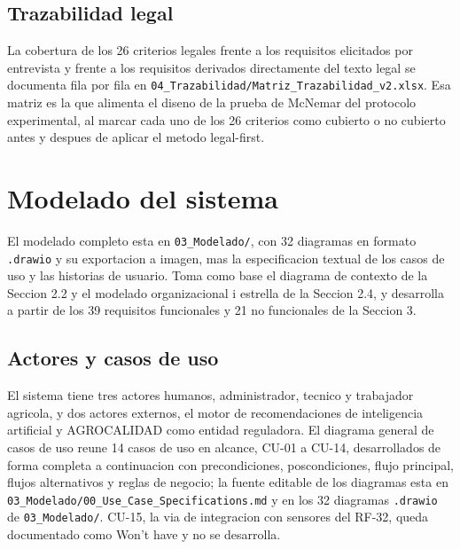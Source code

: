 \documentclass[11pt,a4paper]{article}
\newcommand{\ruta}[1]{\texttt{#1}}
\begin{document}

\subsection{Trazabilidad legal}

La cobertura de los 26 criterios legales frente a los requisitos elicitados por entrevista y frente a los requisitos derivados directamente del texto legal se documenta fila por fila en \ruta{04\_Trazabilidad/Matriz\_Trazabilidad\_v2.xlsx}. Esa matriz es la que alimenta el diseno de la prueba de McNemar del protocolo experimental, al marcar cada uno de los 26 criterios como cubierto o no cubierto antes y despues de aplicar el metodo legal-first.

\section{Modelado del sistema}

El modelado completo esta en \ruta{03\_Modelado/}, con 32 diagramas en formato \texttt{.drawio} y su exportacion a imagen, mas la especificacion textual de los casos de uso y las historias de usuario. Toma como base el diagrama de contexto de la Seccion 2.2 y el modelado organizacional i estrella de la Seccion 2.4, y desarrolla a partir de los 39 requisitos funcionales y 21 no funcionales de la Seccion 3.

\subsection{Actores y casos de uso}

El sistema tiene tres actores humanos, administrador, tecnico y trabajador agricola, y dos actores externos, el motor de recomendaciones de inteligencia artificial y AGROCALIDAD como entidad reguladora. El diagrama general de casos de uso reune 14 casos de uso en alcance, CU-01 a CU-14, desarrollados de forma completa a continuacion con precondiciones, poscondiciones, flujo principal, flujos alternativos y reglas de negocio; la fuente editable de los diagramas esta en \ruta{03\_Modelado/00\_Use\_Case\_Specifications.md} y en los 32 diagramas \texttt{.drawio} de \ruta{03\_Modelado/}. CU-15, la via de integracion con sensores del RF-32, queda documentado como Won't have y no se desarrolla.
\end{document}

